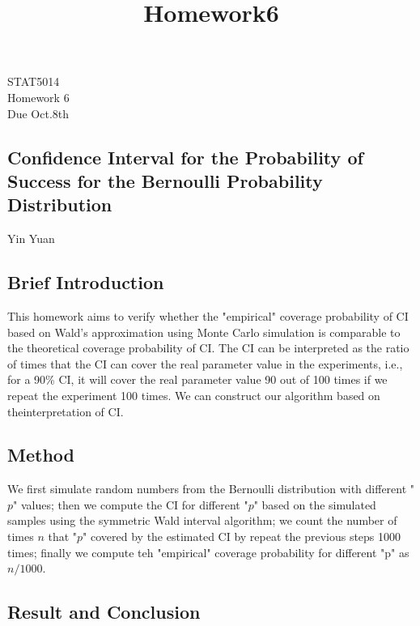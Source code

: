 \documentclass[12pt]{article}
\title{Homework6}
\begin{document}
\newcommand{\argmin}{\text{argmin}}

\noindent STAT5014\\
 Homework 6\\
 Due Oct.8th

\begin{center}
\noindent
\section*{Confidence Interval for the Probability of Success for the Bernoulli Probability Distribution} %
\noindent Yin Yuan\\

\vspace{.25 in}
\end{center}

\subsection*{Brief Introduction}

This homework aims to verify whether the "empirical" coverage probability of CI based on Wald's approximation using Monte Carlo simulation is comparable to the theoretical coverage probability of CI. The CI can be interpreted as the ratio of times that the CI can cover the real parameter value in the experiments, i.e., for a 90\% CI, it will cover the real parameter value 90 out of 100 times if we repeat the experiment 100 times. We can construct our algorithm based on theinterpretation of CI.




\subsection*{Method}

We first simulate random numbers from the Bernoulli distribution with different "$p$" values; then we compute the CI for different "$p$" based on the simulated samples using the symmetric Wald interval algorithm; we count the number of times $n$ that "$p$" covered by the estimated CI by repeat the previous steps 1000 times; finally we compute teh "empirical" coverage probability for different "p" as $n/1000$.

\subsection*{Result and Conclusion}
\end{document}
